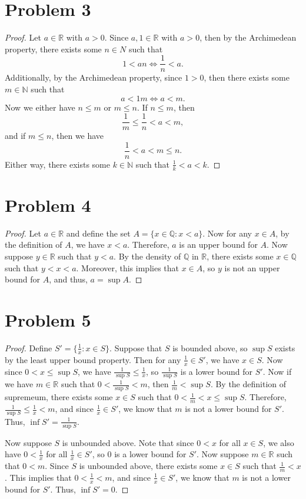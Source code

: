 \documentclass[12pt]{article}
\newcommand{\N}{\mathbb{N}}
\newcommand{\R}{\mathbb{R}}
\newcommand{\Q}{\mathbb{Q}}
\begin{document}
\section*{Problem 3}
\begin{proof}
    Let $a\in\R$ with $a>0$. Since $a,1\in\R$ with $a>0$, then by the Archimedean property, there exists some $n\in N$ such that
    \[1 < an \iff \frac1n < a.\]
    Additionally, by the Archimedean property, since $1>0$, then there exists some $m\in\N$ such that
    \[a < 1m \iff a < m.\]
    Now we either have $n\leq m$ or $m\leq n$. If $n\leq m$, then
    \[\frac1m \leq \frac1n < a < m,\]
    and if $m\leq n$, then we have
    \[\frac1n < a < m \leq n.\]
    Either way, there exists some $k\in\N$ such that $\frac1k < a < k$.
    
\end{proof}

\section*{Problem 4}
\begin{proof}
    Let $a\in \R$ and define the set $A=\{x\in\Q : x<a\}$. Now for any $x\in A$, by the definition of $A$, we have $x<a$. Therefore, $a$ is an upper bound for $A$. Now suppose $y\in\R$ such that $y<a$. By the density of $\Q$ in $\R$, there exists some $x\in\Q$ such that $y<x<a$. Moreover, this implies that $x\in A$, so $y$ is not an upper bound for $A$, and thus, $a=\sup A$.
    
\end{proof}

\newpage
\section*{Problem 5}
\begin{proof}
    Define $S' = \{\frac1x : x\in S\}$. Suppose that $S$ is bounded above, so $\sup S$ exists by the least upper bound property. Then for any $\frac1x\in S'$, we have $x\in S$. Now since $0 < x\leq \sup S$, we have $\frac1{\sup S} \leq \frac1x$, so $\frac1{\sup S}$ is a lower bound for $S'$. Now if we have $m\in\R$ such that $0<\frac1{\sup S} < m$, then $\frac1m < \sup S$. By the definition of supremeum, there exists some $x\in S$ such that $0<\frac1m < x \leq \sup S$. Therefore, $\frac1{\sup S} \leq \frac1x < m$, and since $\frac1x\in S'$, we know that $m$ is not a lower bound for $S'$. Thus, $\inf S' = \frac1{\sup S}$.
    
    Now suppose $S$ is unbounded above. Note that since $0<x$ for all $x\in S$, we also have $0<\frac1x$ for all $\frac1x\in S'$, so $0$ is a lower bound for $S'$. Now suppose $m\in\R$ such that $0<m$. Since $S$ is unbounded above, there exists some $x\in S$ such that $\frac1m< x$. This implies that $0<\frac1x<m$, and since $\frac1x\in S'$, we know that $m$ is not a lower bound for $S'$. Thus, $\inf S' = 0$.
    
\end{proof}
\end{document}
